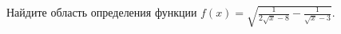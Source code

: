 \begin{ex}
	\begin{condition}
		Найдите область определения функции $f(x) = \sqrt{\tfrac{1}{2\sqrt{x} - 8} - \tfrac{1}{\sqrt{x} - 3}}.$
	\end{condition}
\end{ex}